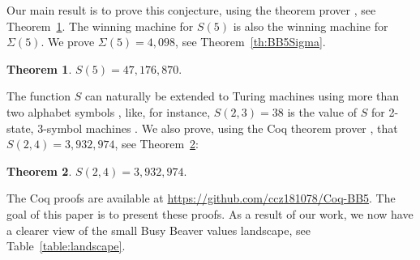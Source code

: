 \documentclass[a4paper,british]{article}
\theoremstyle{definition} %
\newtheorem{theorem}{Theorem}[section]
\numberwithin{equation}{section}
\theoremstyle{definition} %
\newcommand{\BBtheFifth}{47{,}176{,}870}
\newcommand{\SigmaTheFifth}{4{,}098}
\newcommand{\BBTxF}{3{,}932{,}974}
\begin{document}
Our main result is to prove this conjecture, using the \Coq theorem prover \cite{the_coq_development_team_2024_14542673}, see Theorem~\ref{th:BB5}. The winning machine for $S(5)$ is also the winning machine for $\Sigma(5)$. We prove $\Sigma(5) = \SigmaTheFifth$, see Theorem~\ref{th:BB5Sigma}.

\begin{theorem}\label{th:BB5}
    $S(5) = \BBtheFifth$.
\end{theorem}

The function $S$ can naturally be extended to Turing machines using more than two alphabet symbols \cite{BradyMeaningOfLife}, like, for instance, $S(2,3) = 38$ is the value of $S$ for 2-state, 3-symbol machines \cite{BradyMeaningOfLife, MICHEL200445, LafittePapazian2007}. We also prove, using the Coq theorem prover \cite{the_coq_development_team_2024_14542673}, that $S(2,4) = \BBTxF$, see Theorem~\ref{th:BB24}:

\begin{theorem}\label{th:BB24}
    $S(2,4) = \BBTxF$.
\end{theorem}

The Coq proofs are available at \url{https://github.com/ccz181078/Coq-BB5}. The goal of this paper is to present these proofs. As a result of our work, we now have a clearer view of the small Busy Beaver values landscape, see Table~\ref{table:landscape}.
\end{document}
